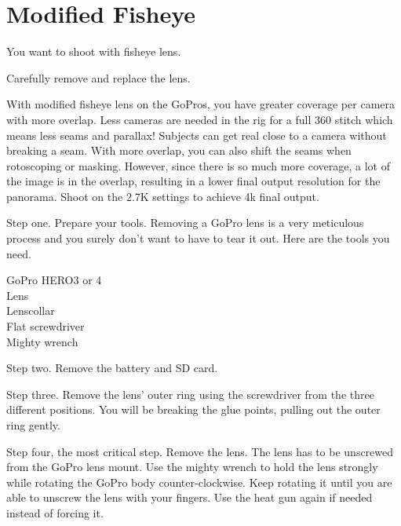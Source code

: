\section{Modified Fisheye}
\pagecolor{white}
\label{chap:26}
\begin{fullwidth}

\problem

{\large You want to shoot with fisheye lens. \par}


\solution

{\large Carefully remove and replace the lens. \par}

With modified fisheye lens on the GoPros, you have greater coverage per camera with more overlap. Less cameras are needed in the rig for a full 360 stitch which means less seams and parallax! Subjects can get real close to a camera without breaking a seam. With more overlap, you can also shift the seams when rotoscoping or masking. However, since there is so much more coverage, a lot of the image is in the overlap, resulting in a lower final output resolution for the panorama. Shoot on the 2.7K settings to achieve 4k final output. 


Step one. Prepare your tools. Removing a GoPro lens is a very meticulous process and you surely don't want to have to tear it out. Here are the tools you need. 

GoPro HERO3 or 4
\\
Lens
\\
Lenscollar
\\
Flat screwdriver
\\
Mighty wrench


Step two. Remove the battery and SD card.


Step three. Remove the lens' outer ring using the screwdriver from the three different positions. You will be breaking the glue points, pulling out the outer ring gently.


Step four, the most critical step. Remove the lens. The lens has to be unscrewed from the GoPro lens mount. Use the mighty wrench to hold the lens strongly while rotating the GoPro body counter-clockwise. Keep rotating it until you are able to unscrew the lens with your fingers. Use the heat gun again if needed instead of forcing it.


\end{fullwidth}
